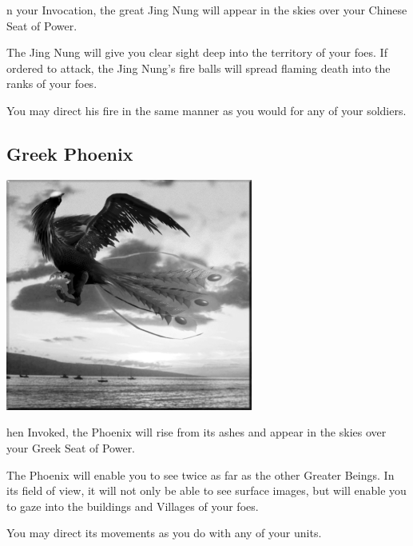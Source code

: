n your Invocation, the great Jing Nung will appear in the skies over your Chinese Seat of Power.

The Jing Nung will give you clear sight deep into the territory of your foes. If ordered to attack, the Jing Nung’s fire balls will spread flaming death into the ranks of your foes.

You may direct his fire in the same manner as you would for any of your soldiers.

\subsection{Greek Phoenix}


\begin{center}
	\includegraphics[width=1\linewidth]{Aphoenix}
\end{center}

hen Invoked, the Phoenix will rise from its ashes and appear in the skies over your Greek Seat of Power.

The Phoenix will enable you to see twice as far as the other Greater Beings. In its field of view, it will not only be able to see surface images, but will enable you to gaze into the buildings and Villages of your foes.

You may direct its movements as you do with any of your units.

